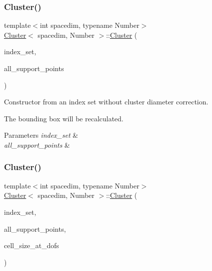 \subsubsection{\texorpdfstring{Cluster()}{Cluster()}\hspace{0.1cm}{\footnotesize\ttfamily [3/7]}}
{\footnotesize\ttfamily template$<$int spacedim, typename Number$>$ \\
\hyperlink{classCluster}{Cluster}$<$ spacedim, Number $>$\+::\hyperlink{classCluster}{Cluster} (\begin{DoxyParamCaption}\item[{const std\+::vector$<$ types\+::global\+\_\+dof\+\_\+index $>$ \&}]{index\+\_\+set,  }\item[{const std\+::vector$<$ Point$<$ spacedim, Number $>$$>$ \&}]{all\+\_\+support\+\_\+points }\end{DoxyParamCaption})}

Constructor from an index set without cluster diameter correction.

The bounding box will be recalculated. 
\begin{DoxyParams}{Parameters}
{\em index\+\_\+set} & \\
\hline
{\em all\+\_\+support\+\_\+points} & \\
\hline
\end{DoxyParams}
\mbox{\label{classCluster_a07a5837c2f6c0b676ca45b826e51b460}} 
\subsubsection{\texorpdfstring{Cluster()}{Cluster()}\hspace{0.1cm}{\footnotesize\ttfamily [4/7]}}
{\footnotesize\ttfamily template$<$int spacedim, typename Number$>$ \\
\hyperlink{classCluster}{Cluster}$<$ spacedim, Number $>$\+::\hyperlink{classCluster}{Cluster} (\begin{DoxyParamCaption}\item[{const std\+::vector$<$ types\+::global\+\_\+dof\+\_\+index $>$ \&}]{index\+\_\+set,  }\item[{const std\+::vector$<$ Point$<$ spacedim, Number $>$$>$ \&}]{all\+\_\+support\+\_\+points,  }\item[{const std\+::vector$<$ Number $>$ \&}]{cell\+\_\+size\+\_\+at\+\_\+dofs }\end{DoxyParamCaption})}

